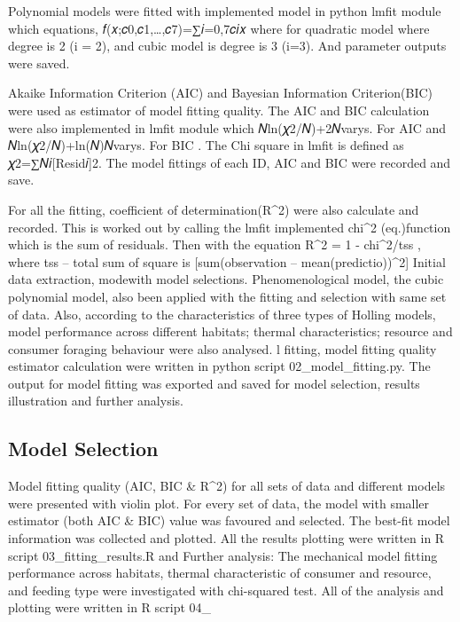 \documentclass[11pt, a4paper]{article}
\begin{document}
Polynomial models were fitted with implemented model in python lmfit module which equations,
𝑓(𝑥;𝑐0,𝑐1,…,𝑐7)=∑𝑖=0,7𝑐𝑖𝑥  where for quadratic model where degree is 2 (i = 2), and cubic model is degree is 3 (i=3). And parameter outputs were saved.

Akaike Information Criterion (AIC) and Bayesian Information Criterion(BIC) were used as estimator of model fitting quality. The AIC and BIC calculation were also implemented in lmfit module which 𝑁ln(𝜒2/𝑁)+2𝑁varys. For AIC and 𝑁ln(𝜒2/𝑁)+ln(𝑁)𝑁varys. For BIC . The Chi square in lmfit is defined as 𝜒2=∑𝑁𝑖[Resid𝑖]2.  The model fittings of each ID, AIC and BIC were recorded and save.

For all the fitting, coefficient of determination(R^2) were also calculate and recorded. This is worked out by calling the lmfit implemented chi^2 (eq.)function which is the sum of residuals. Then with the equation R^2 = 1 - chi^2/tss , where tss – total sum of square is [sum(observation – mean(predictio))^2]
Initial data extraction, modewith model selections. Phenomenological model, the cubic polynomial model, also been applied with the fitting and selection with same set of data. Also, according to the characteristics of three types of Holling models, model performance across different habitats; thermal characteristics; resource and consumer foraging behaviour were also analysed.
l fitting, model fitting quality estimator calculation were written in python script 02_model_fitting.py. The output for model fitting was exported and saved for model selection, results illustration and further analysis. 

\subsection{Model Selection}
Model fitting quality (AIC, BIC & R^2) for all sets of data and different models were presented with violin plot. For every set of data, the model with smaller estimator (both AIC & BIC) value was favoured and selected. The best-fit model information was collected and plotted. All the results plotting were written in R script 03_fitting_results.R and 
Further analysis: 
The mechanical model fitting performance across habitats, thermal characteristic of consumer and resource, and feeding type were investigated with chi-squared test.  All of the analysis and plotting were written in R script 04_
\end{document}

